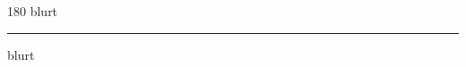 
\begin{frame}
\begin{center}
\begin{turn}{180}
{\fontsize{2.5cm}{1em}\selectfont blurt}
\end{turn}
\vspace{1em}\par  
\hrule
\vspace{1em}\par  
{\fontsize{2.5cm}{1em}\selectfont blurt}
\end{center}
\end{frame}
